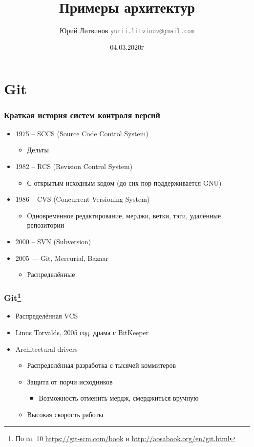 \documentclass[xetex,mathserif,serif]{beamer}
\title{Примеры архитектур}
\author[Юрий Литвинов]{Юрий Литвинов \newline \textcolor{gray}{\small\texttt{yurii.litvinov@gmail.com}}}
\date{04.03.2020г}
\begin{document}
	
	\frame{\titlepage}

	\section{Git}

	\begin{frame}
		\frametitle{Краткая история систем контроля версий}
		\begin{itemize}
			\item 1975 -- SCCS (Source Code Control System)
			\begin{itemize}
				\item Дельты
			\end{itemize}
			\item 1982 -- RCS (Revision Control System)
			\begin{itemize}
				\item С открытым исходным кодом (до сих пор поддерживается GNU)
			\end{itemize}
			\item 1986 -- CVS (Concurrent Versioning System)
			\begin{itemize}
				\item Одновременное редактирование, мерджи, ветки, тэги, удалённые репозитории
			\end{itemize}
			\item 2000 -- SVN (Subversion)
			\item 2005 --- Git, Mercurial, Bazaar
			\begin{itemize}
				\item Распределённые
			\end{itemize}
		\end{itemize}
	\end{frame}

	\begin{frame}
		\frametitle{Git\footnote{\tiny{По гл. 10 \url{https://git-scm.com/book} и \url{http://aosabook.org/en/git.html}}}}
		\begin{itemize}
			\item Распределённая VCS
			\item Linus Torvalds, 2005 год, драма с BitKeeper
			\item Architectural drivers
			\begin{itemize}
				\item Распределённая разработка с тысячей коммитеров
				\item Защита от порчи исходников
				\begin{itemize}
					\item Возможность отменить мердж, смерджиться вручную
				\end{itemize}
				\item Высокая скорость работы
			\end{itemize}
		\end{itemize}
	\end{frame}
\end{document}
